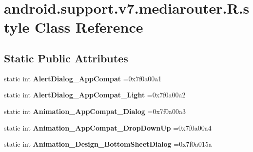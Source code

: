 \hypertarget{classandroid_1_1support_1_1v7_1_1mediarouter_1_1R_1_1style}{}\section{android.\+support.\+v7.\+mediarouter.\+R.\+style Class Reference}
\label{classandroid_1_1support_1_1v7_1_1mediarouter_1_1R_1_1style}
\subsection*{Static Public Attributes}
\begin{DoxyCompactItemize}
\item 
\mbox{\label{classandroid_1_1support_1_1v7_1_1mediarouter_1_1R_1_1style_aad79e7ef8cdcb39e232dc54ce87ecced}} 
static int {\bfseries Alert\+Dialog\+\_\+\+App\+Compat} =0x7f0a00a1
\item 
\mbox{\label{classandroid_1_1support_1_1v7_1_1mediarouter_1_1R_1_1style_aac0b22d09d0ec2410e68784df78dbc29}} 
static int {\bfseries Alert\+Dialog\+\_\+\+App\+Compat\+\_\+\+Light} =0x7f0a00a2
\item 
\mbox{\label{classandroid_1_1support_1_1v7_1_1mediarouter_1_1R_1_1style_a3dd84909ca591494c8cd91e23b5a3a1e}} 
static int {\bfseries Animation\+\_\+\+App\+Compat\+\_\+\+Dialog} =0x7f0a00a3
\item 
\mbox{\label{classandroid_1_1support_1_1v7_1_1mediarouter_1_1R_1_1style_ac740d7e6d87e580ce75bf4a49d0746a1}} 
static int {\bfseries Animation\+\_\+\+App\+Compat\+\_\+\+Drop\+Down\+Up} =0x7f0a00a4
\item 
\mbox{\label{classandroid_1_1support_1_1v7_1_1mediarouter_1_1R_1_1style_acbc6e41eb45eecdce280f774471106fd}} 
static int {\bfseries Animation\+\_\+\+Design\+\_\+\+Bottom\+Sheet\+Dialog} =0x7f0a015a
\item 
\mbox{\label{classandroid_1_1support_1_1v7_1_1mediarouter_1_1R_1_1style_adeb38355347be79e102b53c948039712}} 

\end{DoxyCompactItemize}
